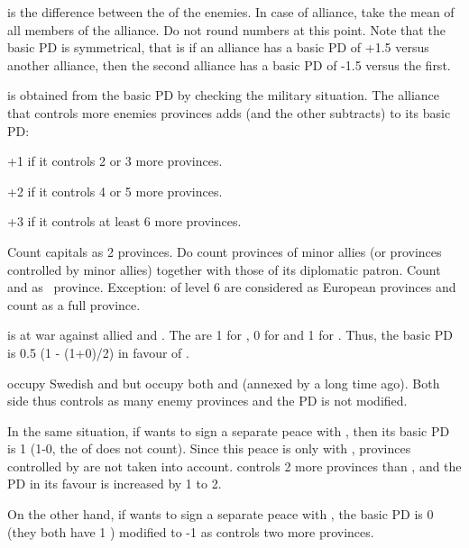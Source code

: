  is the difference between the \STAB of
the enemies.
\bparag In case of alliance, take the mean \STAB of all members of the
alliance. Do not round numbers at this point.
\bparag Note that the basic PD is symmetrical, that is if an alliance has a
basic PD of +1.5 versus another alliance, then the second alliance has a basic
PD of -1.5 versus the first.

 is obtained from the basic PD by
checking the military situation.
\bparag The alliance that controls more enemies provinces adds (and the other
subtracts) to its basic PD:
\begin{modlist}
  \item[+1] if it controls 2 or 3 more provinces.
  \item[+2] if it controls 4 or 5 more provinces.
  \item[+3] if it controls at least 6 more provinces.
\end{modlist}
\bparag Count capitals as 2 provinces.
\bparag Do count provinces of minor allies (or provinces controlled by minor
allies) together with those of its diplomatic patron.
\bparag Count \COL and \TP as \undemi\ province. Exception: \COL of level
6 are considered as European provinces and count as a full province.

\begin{exemple}
  \RUS is at war against allied \TUR and \SUE. The \STAB are 1 for \RUS, 0 for
  \SUE and 1 for \TUR. Thus, the basic PD is 0.5 (1 - (1+0)/2) in favour of
  \RUS.

  \RUS occupy Swedish \provinceNeva and \provinceKarelen but \TUR occupy both
  \provinceAstragan and \provinceTerek (annexed by \RUS a long time
  ago). Both side thus controls as many enemy provinces and the PD is not
  modified.
\end{exemple}

\begin{exemple}
  In the same situation, if \RUS wants to sign a separate peace with \SUE,
  then its basic PD is 1 (1-0, the \STAB of \TUR does not count). Since this
  peace is only with \SUE, provinces controlled by \TUR are not taken into
  account. \RUS controls 2 more provinces than \SUE, and the PD in its favour
  is increased by 1 to 2.

  On the other hand, if \RUS wants to sign a separate peace with \TUR, the
  basic PD is 0 (they both have 1 \STAB) modified to -1 as \TUR controls two
  more provinces.
\end{exemple}

